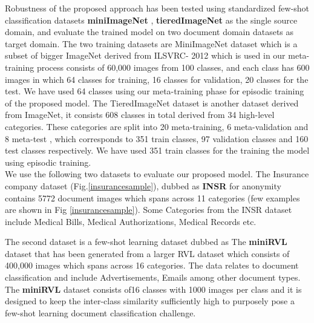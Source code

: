 Robustness of the proposed approach  has been tested using standardized few-shot classification datasets \textbf{miniImageNet} \citep{ravi2016optimization}, \textbf{tieredImageNet} as the single source domain, and evaluate the trained model on two document domain datasets as target domain. The two training datasets are  MiniImageNet dataset which is a subset of bigger ImageNet derived from ILSVRC- 2012 \citep{russakovsky2015imagenet} which is used in our meta-training process consists of 60,000 images from 100 classes, and each class has 600 images in which 64 classes for training, 16 classes for validation, 20 classes for the test. We have used 64 classes using our meta-training phase for episodic training of the proposed model. The TieredImageNet dataset is another dataset derived from ImageNet, it consists 608 classes in total derived from  34 high-level categories. These categories are split into
20 meta-training, 6 meta-validation  and 8 meta-test , which corresponds to 351 train classes, 97 validation classes and 160 test classes respectively. We have used  351 train classes for the training the model using episodic training.\\

We use the following two datasets to evaluate our proposed model. The Insurance company dataset (Fig.\ref{insurancesample}), dubbed as \textbf{INSR} for anonymity contains 5772 document images which spans across 11 categories (few examples are shown in Fig \ref{insurancesample}). Some Categories from the INSR dataset include Medical Bills, Medical Authorizations, Medical Records etc. 

The second dataset is a few-shot learning dataset dubbed as The \textbf{miniRVL} dataset \cite{harley2015evaluation} that has been generated from a larger RVL dataset which consists of 400,000 images which spans across 16 categories. The data relates to  document classification and include Advertisements, Emails among other document types. The \textbf{miniRVL} dataset  consists of16 classes with 1000 images per class and it is designed to keep the inter-class similarity sufficiently high to purposely pose a few-shot learning document classification challenge.




